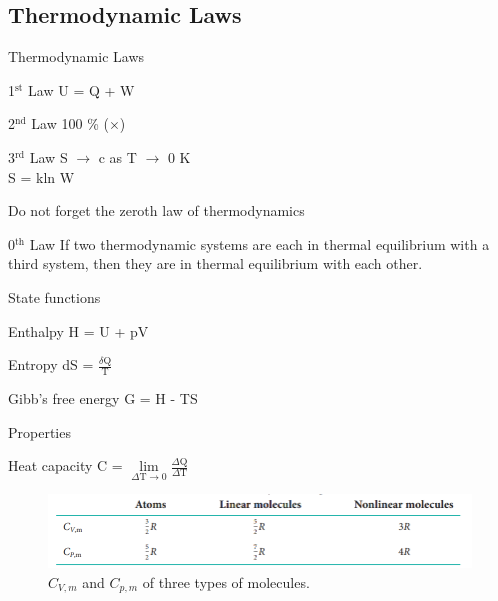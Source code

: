 \documentclass[12pt,compress]{beamer}
\begin{document}
\subsection{Thermodynamic Laws}
\begin{frame}{Thermodynamic Laws}
    \begin{block}{1$^{\text{st}}$ Law}
        U = Q + W
    \end{block}
    \begin{block}{2$^{\text{nd}}$ Law}
        100 \% ($\times$)
    \end{block}
    \begin{block}{3$^{\text{rd}}$ Law}
        S $\rightarrow$ c as T $\rightarrow$ 0 K \\
        S = kln W
    \end{block}
\end{frame}
\begin{frame}{Do not forget the zeroth law of thermodynamics}
    \begin{block}{0$^\text{th}$ Law}
        If two thermodynamic systems are each in thermal equilibrium with a third system, then they are in thermal equilibrium with each other.
    \end{block}
\end{frame}
\begin{frame}{State functions}
    \begin{block}{Enthalpy}
        H = U + pV
    \end{block}
    \begin{block}{Entropy}
        dS = $\frac{\delta \text{Q}}{\text{T}}$
    \end{block}
    \begin{block}{Gibb's free energy}
        G = H - TS
    \end{block}
\end{frame}
\begin{frame}{Properties}
    \begin{block}{Heat capacity}
        C = $\lim\limits_{\Delta \text{T} \rightarrow 0}\frac{\Delta \text{Q}}{\Delta \text{T}}$
    \end{block}
    \begin{figure}[H]
        \centering
        \includegraphics[width=\textwidth]{KMT.png}
        \caption{$C_{V,m}$ and $C_{p,m}$ of three types of molecules.}
    \end{figure}
\end{frame}
\end{document}
